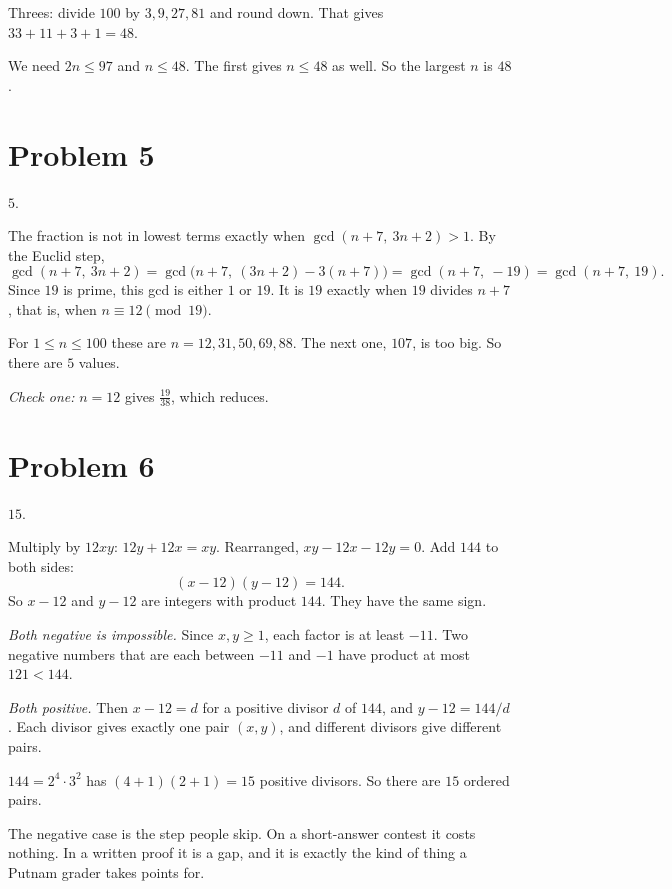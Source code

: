 \documentclass[11pt]{article}
\begin{document}
Threes: divide $100$ by $3, 9, 27, 81$ and round down. That gives $33 + 11 + 3 + 1 = 48$.

We need $2n \le 97$ and $n \le 48$. The first gives $n \le 48$ as well. So the largest $n$ is $48$.

\section*{Problem 5}
\begin{answer} $5$. \end{answer}
The fraction is not in lowest terms exactly when $\gcd(n + 7,\ 3n + 2) > 1$. By the Euclid step,
\[ \gcd(n + 7,\ 3n + 2) = \gcd\bigl(n + 7,\ (3n + 2) - 3(n + 7)\bigr) = \gcd(n + 7,\ -19) = \gcd(n + 7,\ 19). \]
Since $19$ is prime, this gcd is either $1$ or $19$. It is $19$ exactly when $19$ divides $n + 7$, that is, when $n \equiv 12 \pmod{19}$.

For $1 \le n \le 100$ these are $n = 12, 31, 50, 69, 88$. The next one, $107$, is too big. So there are $5$ values.

\emph{Check one:} $n = 12$ gives $\frac{19}{38}$, which reduces.

\section*{Problem 6}
\begin{answer} $15$. \end{answer}
Multiply by $12xy$: $12y + 12x = xy$. Rearranged, $xy - 12x - 12y = 0$. Add $144$ to both sides:
\[ (x - 12)(y - 12) = 144. \]
So $x - 12$ and $y - 12$ are integers with product $144$. They have the same sign.

\emph{Both negative is impossible.} Since $x, y \ge 1$, each factor is at least $-11$. Two negative numbers that are each between $-11$ and $-1$ have product at most $121 < 144$.

\emph{Both positive.} Then $x - 12 = d$ for a positive divisor $d$ of $144$, and $y - 12 = 144/d$. Each divisor gives exactly one pair $(x, y)$, and different divisors give different pairs.

$144 = 2^4 \cdot 3^2$ has $(4+1)(2+1) = 15$ positive divisors. So there are $15$ ordered pairs.

\begin{gradingnote}
The negative case is the step people skip. On a short-answer contest it costs nothing. In a written proof it is a gap, and it is exactly the kind of thing a Putnam grader takes points for.
\end{gradingnote}
\end{document}
